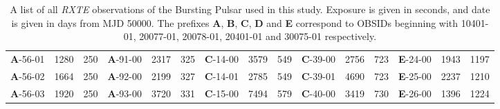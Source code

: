 \begin{table*}
\begin{tabular}{lllllllllllllll}
\textbf{A}-56-01&1280&250&\textbf{A}-91-00&2317&325&\textbf{C}-14-00&3579&549&\textbf{C}-39-00&2756&723&\textbf{E}-24-00&1943&1197\\
\textbf{A}-56-02&1664&250&\textbf{A}-92-00&2199&327&\textbf{C}-14-01&2785&549&\textbf{C}-39-01&4690&723&\textbf{E}-25-00&2237&1210\\
\textbf{A}-56-03&1920&250&\textbf{A}-93-00&3720&331&\textbf{C}-15-00&7494&579&\textbf{C}-40-00&3419&730&\textbf{E}-26-00&1396&1224\\
\hline
\hline
\end{tabular}
\caption{A list of all \textit{RXTE} observations of the Bursting Pulsar used in this study.  Exposure is given in seconds, and date is given in days from MJD 50000.  The prefixes \textbf{A}, \textbf{B}, \textbf{C}, \textbf{D} and \textbf{E} correspond to OBSIDs beginning with 10401-01, 20077-01, 20078-01, 20401-01 and 30075-01 respectively.}
\label{tab:obslist}
\end{table*}

